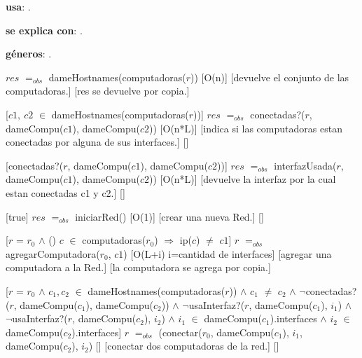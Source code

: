 \begin{Interfaz}

  \textbf{usa}: .
  
  \textbf{se explica con}: .

  \textbf{g\'eneros}: .


  {$res$ $=_{obs}$ dameHostnames(computadoras($r$))}%
  [O(n)]
  [devuelve el conjunto de las computadoras.]
  [res se devuelve por copia.]

  [$c1,\ c2$ $\in$ dameHostnames(computadoras($r$))]
  {$res$ $=_{obs}$ conectadas?($r$, dameCompu($c1$), dameCompu($c2$))}
  [O(n*L)]
  [indica si las computadoras estan conectadas por alguna de sus interfaces.]
  []

  [conectadas?($r$, dameCompu($c1$), dameCompu($c2$))]
  {$res$ $=_{obs}$ interfazUsada($r$, dameCompu($c1$), dameCompu($c2$))}
  [O(n*L)]
  [devuelve la interfaz por la cual estan conectadas c1 y c2.]
  []

  [true]
  {$res$ $=_{obs}$ iniciarRed()}
  [O(1)]
  [crear una nueva Red.]
  []
  
  [$r$ = $r_0$ $\wedge$
  () $c$ $\in$ computadoras($r_0$) $\Rightarrow$ ip($c$) $\neq$ $c1$]
  {$r$ $=_{obs}$ agregarComputadora($r_0$, $c1$)}
  [O(L+i) i=cantidad de interfaces]
  [agregar una computadora a la Red.]
  [la computadora se agrega por copia.]

  [$r$ = $r_0$ $\wedge$ $c_1, c_2$ $\in$ dameHostnames(computadoras($r$)) $\wedge$ $c_1$ $\neq$ $c_2$	$\wedge$ \newline $\neg$conectadas?($r$, dameCompu($c_1$), dameCompu($c_2$)) $\wedge$ $\neg$usaInterfaz?($r$, dameCompu($c_1$), $i_1$) $\wedge$ $\neg$usaInterfaz?($r$, dameCompu($c_2$), $i_2$) $\wedge$ $i_1$ $\in$ dameCompu($c_1$).interfaces $\wedge$ $i_2$ $\in$ dameCompu($c_2$).interfaces]
  {$r$ $=_{obs}$ (conectar($r_0$, dameCompu($c_1$), $i_1$, dameCompu($c_2$), $i_2$)}
  []
  [conectar dos computadoras de la red.]
  []
   

\end{Interfaz}
